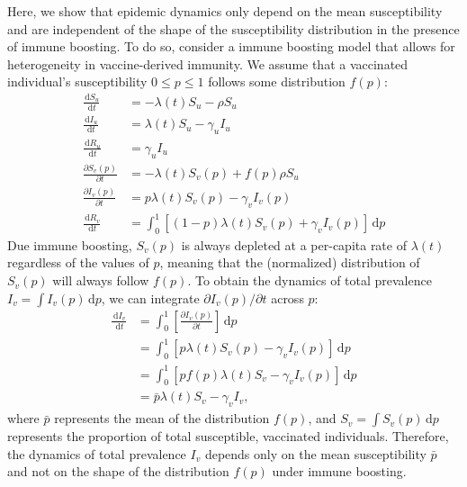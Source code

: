 \documentclass[12pt]{article}
\newcommand{\dd}[1]{\ensuremath{\, \mathrm{d}#1}}
\begin{document}
Here, we show that epidemic dynamics only depend on the mean susceptibility and are independent of the shape of the susceptibility distribution in the presence of immune boosting.
To do so, consider a immune boosting model that allows for heterogeneity in vaccine-derived immunity.
We assume that a vaccinated individual's susceptibility $0 \leq p \leq 1$ follows some distribution $f(p)$:
\begin{align}
\frac{\dd S_u}{\dd t} &= - \lambda(t) S_u - \rho S_u \\
\frac{\dd I_u}{\dd t} &= \lambda(t) S_u - \gamma_u I_u \\
\frac{\dd R_u}{\dd t} &= \gamma_u I_u \\
\frac{\partial S_v(p)}{\partial t} &= - \lambda(t) S_v(p) + f(p) \rho S_u  \\
\frac{\partial I_v(p)}{\partial t} &= p \lambda(t) S_v(p) - \gamma_v I_v(p) \\
\frac{\dd R_v}{\dd t} &= \int_0^1 \left[ (1-p) \lambda(t) S_v(p) + \gamma_v I_v(p) \right]\dd p
\end{align}
Due immune boosting, $S_v(p)$ is always depleted at a per-capita rate of $\lambda(t)$ regardless of the values of $p$, meaning that the (normalized) distribution of $S_v(p)$ will always follow $f(p)$.
To obtain the dynamics of total prevalence $I_v = \int I_v(p) \dd p$, we can integrate $\partial I_v(p)/\partial t$ across $p$:
\begin{align}
\frac{\dd I_v}{\dd t} &=  \int_0^1\left[\frac{\partial I_v(p)}{\partial t}\right]\dd p\\
&= \int_0^1\left[p \lambda(t) S_v(p) - \gamma_v I_v(p)\right]\dd p\\
&= \int_0^1\left[p f(p) \lambda(t) S_v - \gamma_v I_v(p)\right]\dd p\\
&= \bar{p} \lambda(t) S_v - \gamma_v I_v,
\end{align}
where $\bar{p}$ represents the mean of the distribution $f(p)$, and $S_v = \int S_v(p) \dd p$ represents the proportion of total susceptible, vaccinated individuals.
Therefore, the dynamics of total prevalence $I_v$ depends only on the mean susceptibility $\bar{p}$ and not on the shape of the distribution $f(p)$ under immune boosting.

\pagebreak


\end{document}
